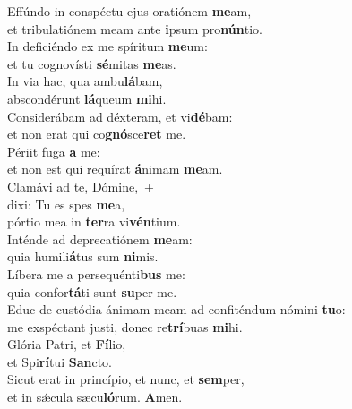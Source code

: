 \evenverse Effúndo in conspéctu ejus oratiónem \textbf{me}am,~\*\\
\evenverse et tribulatiónem meam ante \textbf{i}psum pro\textbf{nún}tio.\\
\oddverse In deficiéndo ex me spíritum \textbf{me}um:~\*\\
\oddverse et tu cognovísti \textbf{sé}mitas \textbf{me}as.\\
\evenverse In via hac, qua ambu\textbf{lá}bam,~\*\\
\evenverse abscondérunt \textbf{lá}queum \textbf{mi}hi.\\
\oddverse Considerábam ad déxteram, et vi\textbf{dé}bam:~\*\\
\oddverse et non erat qui co\textbf{gnó}sce\textbf{ret} me.\\
\evenverse Périit fuga \textbf{a} me:~\*\\
\evenverse et non est qui requírat \textbf{á}nimam \textbf{me}am.\\
\oddverse Clamávi ad te, Dómine,~+\\
\oddverse  dixi: Tu es spes \textbf{me}a,~\*\\
\oddverse pórtio mea in \textbf{ter}ra vi\textbf{vén}tium.\\
\evenverse Inténde ad deprecatiónem \textbf{me}am:~\*\\
\evenverse quia humili\textbf{á}tus sum \textbf{ni}mis.\\
\oddverse Líbera me a persequénti\textbf{bus} me:~\*\\
\oddverse quia confor\textbf{tá}ti sunt \textbf{su}per me.\\
\evenverse Educ de custódia ánimam meam ad confiténdum nómini \textbf{tu}o:~\*\\
\evenverse me exspéctant justi, donec re\textbf{trí}buas \textbf{mi}hi.\\
\oddverse Glória Patri, et \textbf{Fí}lio,~\*\\
\oddverse et Spi\textbf{rí}tui \textbf{San}cto.\\
\evenverse Sicut erat in princípio, et nunc, et \textbf{sem}per,~\*\\
\evenverse et in sǽcula sæcu\textbf{ló}rum. \textbf{A}men.\\
